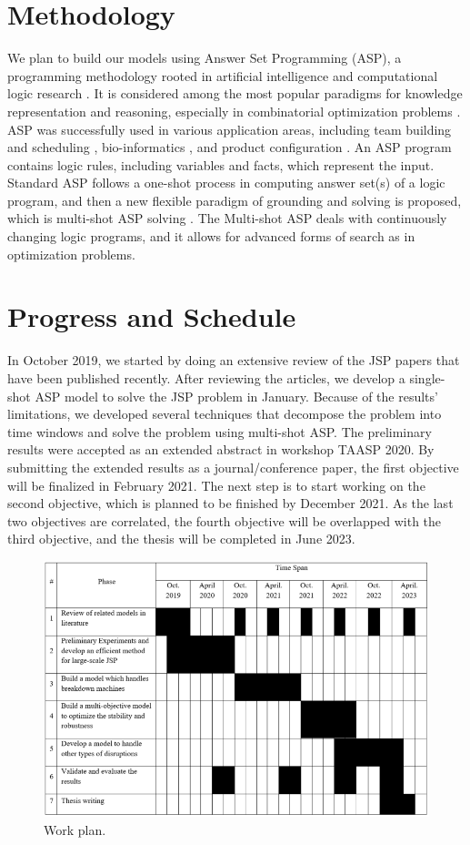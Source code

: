\documentclass{article}
\begin{document}
\section{Methodology}
We plan to build our models using Answer Set Programming (ASP), a programming methodology rooted in artificial intelligence and computational logic research \cite{lifschitz2002answer}. It is considered among the most popular paradigms for knowledge representation and reasoning, especially in combinatorial optimization problems \cite{abseher2016shift}. ASP was successfully used in various application areas, including team building and scheduling \cite{ricca2011team}, bio-informatics \cite{guziolowski2013exhaustively}, and product configuration \cite{soininen1999developing}. An ASP program contains logic rules, including variables and facts, which represent the input. Standard ASP follows a one-shot process in computing answer set(s) of a logic program, and then a new flexible paradigm of grounding and solving is proposed, which is multi-shot ASP solving \cite{gebser2019multi}. The Multi-shot ASP deals with continuously changing logic programs, and it allows for advanced forms of search as in optimization problems.

\section{Progress and Schedule}
In October 2019, we started by doing an extensive review of the JSP papers that have been published recently. After reviewing the articles, we develop a single-shot ASP model to solve the JSP problem in January. Because of the results' limitations, we developed several techniques that decompose the problem into time windows and solve the problem using multi-shot ASP. The preliminary results were accepted as an extended abstract in workshop TAASP 2020. By submitting the extended results as a journal/conference paper, the first objective will be finalized in February 2021. The next step is to start working on the second objective, which is planned to be finished by December 2021. As the last two objectives are correlated, the fourth objective will be overlapped with the third objective, and the thesis will be completed in June 2023. 

\begin{figure}[h!]
  \includegraphics[width=\linewidth]{Plan2.png}
  \caption{Work plan.}
  \label{fig:Work plan}
\end{figure}
\newpage


\end{document}
